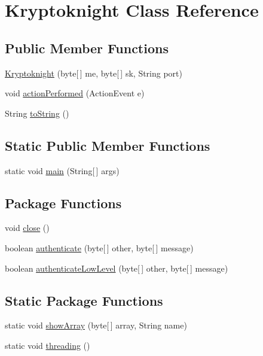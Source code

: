 \hypertarget{class_kryptoknight}{
\section{Kryptoknight Class Reference}
\label{class_kryptoknight}
}
\subsection*{Public Member Functions}
\begin{CompactItemize}
\item 
\hyperlink{class_kryptoknight_a0}{Kryptoknight} (byte\mbox{[}$\,$\mbox{]} me, byte\mbox{[}$\,$\mbox{]} sk, String port)
\item 
void \hyperlink{class_kryptoknight_a1}{action\-Performed} (Action\-Event e)
\item 
String \hyperlink{class_kryptoknight_a2}{to\-String} ()
\end{CompactItemize}
\subsection*{Static Public Member Functions}
\begin{CompactItemize}
\item 
static void \hyperlink{class_kryptoknight_e0}{main} (String\mbox{[}$\,$\mbox{]} args)
\end{CompactItemize}
\subsection*{Package Functions}
\begin{CompactItemize}
\item 
void \hyperlink{class_kryptoknight_c0}{close} ()
\item 
boolean \hyperlink{class_kryptoknight_c1}{authenticate} (byte\mbox{[}$\,$\mbox{]} other, byte\mbox{[}$\,$\mbox{]} message)
\item 
boolean \hyperlink{class_kryptoknight_c2}{authenticate\-Low\-Level} (byte\mbox{[}$\,$\mbox{]} other, byte\mbox{[}$\,$\mbox{]} message)
\end{CompactItemize}
\subsection*{Static Package Functions}
\begin{CompactItemize}
\item 
static void \hyperlink{class_kryptoknight_g0}{show\-Array} (byte\mbox{[}$\,$\mbox{]} array, String name)
\item 
static void \hyperlink{class_kryptoknight_g1}{threading} ()
\end{CompactItemize}
